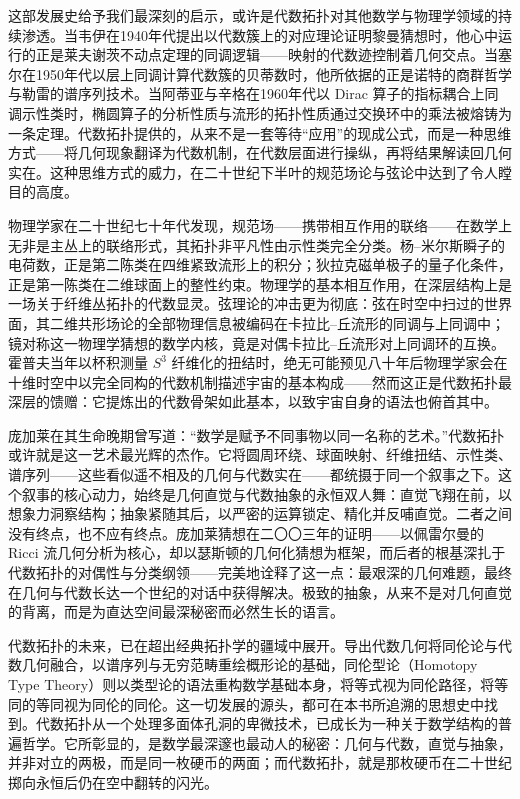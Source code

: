 \documentclass[12pt,a4paper]{article}
\begin{document}
这部发展史给予我们最深刻的启示，或许是代数拓扑对其他数学与物理学领域的持续渗透。当韦伊在1940年代提出以代数簇上的对应理论证明黎曼猜想时，他心中运行的正是莱夫谢茨不动点定理的同调逻辑——映射的代数迹控制着几何交点。当塞尔在1950年代以层上同调计算代数簇的贝蒂数时，他所依据的正是诺特的商群哲学与勒雷的谱序列技术。当阿蒂亚与辛格在1960年代以 Dirac 算子的指标耦合上同调示性类时，椭圆算子的分析性质与流形的拓扑性质通过交换环中的乘法被熔铸为一条定理。代数拓扑提供的，从来不是一套等待“应用”的现成公式，而是一种思维方式——将几何现象翻译为代数机制，在代数层面进行操纵，再将结果解读回几何实在。这种思维方式的威力，在二十世纪下半叶的规范场论与弦论中达到了令人瞠目的高度。

物理学家在二十世纪七十年代发现，规范场——携带相互作用的联络——在数学上无非是主丛上的联络形式，其拓扑非平凡性由示性类完全分类。杨–米尔斯瞬子的电荷数，正是第二陈类在四维紧致流形上的积分；狄拉克磁单极子的量子化条件，正是第一陈类在二维球面上的整性约束。物理学的基本相互作用，在深层结构上是一场关于纤维丛拓扑的代数显灵。弦理论的冲击更为彻底：弦在时空中扫过的世界面，其二维共形场论的全部物理信息被编码在卡拉比–丘流形的同调与上同调中；镜对称这一物理学猜想的数学内核，竟是对偶卡拉比–丘流形对上同调环的互换。霍普夫当年以杯积测量 $S^3$ 纤维化的扭结时，绝无可能预见八十年后物理学家会在十维时空中以完全同构的代数机制描述宇宙的基本构成——然而这正是代数拓扑最深层的馈赠：它提炼出的代数骨架如此基本，以致宇宙自身的语法也俯首其中。

庞加莱在其生命晚期曾写道：“数学是赋予不同事物以同一名称的艺术。”代数拓扑或许就是这一艺术最光辉的杰作。它将圆周环绕、球面映射、纤维扭结、示性类、谱序列——这些看似遥不相及的几何与代数实在——都统摄于同一个叙事之下。这个叙事的核心动力，始终是几何直觉与代数抽象的永恒双人舞：直觉飞翔在前，以想象力洞察结构；抽象紧随其后，以严密的运算锁定、精化并反哺直觉。二者之间没有终点，也不应有终点。庞加莱猜想在二〇〇三年的证明——以佩雷尔曼的 Ricci 流几何分析为核心，却以瑟斯顿的几何化猜想为框架，而后者的根基深扎于代数拓扑的对偶性与分类纲领——完美地诠释了这一点：最艰深的几何难题，最终在几何与代数长达一个世纪的对话中获得解决。极致的抽象，从来不是对几何直觉的背离，而是为直达空间最深秘密而必然生长的语言。

代数拓扑的未来，已在超出经典拓扑学的疆域中展开。导出代数几何将同伦论与代数几何融合，以谱序列与无穷范畴重绘概形论的基础，同伦型论（Homotopy Type Theory）则以类型论的语法重构数学基础本身，将等式视为同伦路径，将等同的等同视为同伦的同伦。这一切发展的源头，都可在本书所追溯的思想史中找到。代数拓扑从一个处理多面体孔洞的卑微技术，已成长为一种关于数学结构的普遍哲学。它所彰显的，是数学最深邃也最动人的秘密：几何与代数，直觉与抽象，并非对立的两极，而是同一枚硬币的两面；而代数拓扑，就是那枚硬币在二十世纪掷向永恒后仍在空中翻转的闪光。
\end{document}

